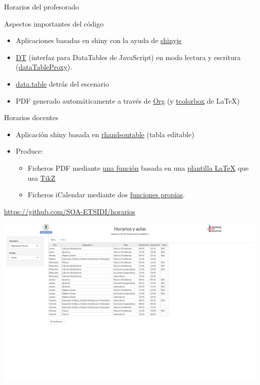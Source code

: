 \documentclass[spanish, xcolor={usenames,svgnames,dvipsnames}]{beamer}
\begin{document}
\begin{frame}[label={sec:org2fe8bf3}]{Horarios del profesorado}
\begin{block}{Aspectos importantes del código}
\begin{itemize}
\item Aplicaciones basadas en shiny con la ayuda de \href{https://daattali.com/shiny/shinyjs-demo/}{shinyjs}
\item \href{https://github.com/Rdatatable/data.table/wiki}{DT} (interfaz para DataTables de JavaScript) en modo lectura y escritura (\href{https://yihui.shinyapps.io/DT-proxy/}{dataTableProxy}).
\item \href{https://github.com/Rdatatable/data.table/wiki}{data.table} detrás del escenario
\item PDF generado automáticamente a través de \href{http://orgmode.org/}{Org} (y \href{https://www.ctan.org/pkg/tcolorbox}{tcolorbox} de \LaTeX{})
\end{itemize}
\end{block}
\end{frame}
\begin{frame}[label={sec:orgfb39c1d}]{Horarios docentes}
\begin{itemize}
\item Aplicación shiny basada en \href{http://jrowen.github.io/rhandsontable/}{rhandsontable} (tabla editable)
\item Produce:
\begin{itemize}
\item Ficheros PDF mediante \href{https://github.com/SOA-ETSIDI/horarios/blob/master/csv2tt.R}{una función} basada en una \href{https://github.com/SOA-ETSIDI/horarios/blob/master/timetable.tex}{plantilla \LaTeX{}} que usa \href{https://en.wikipedia.org/wiki/PGF/TikZ}{TikZ}
\item Ficheros iCalendar mediante dos \href{https://github.com/SOA-ETSIDI/misc/blob/master/funciones.R}{funciones propias}.
\end{itemize}
\end{itemize}
\begin{block}{}
\url{https://github.com/SOA-ETSIDI/horarios}
\end{block}
\end{frame}
\begin{frame}[label={sec:org995b659}]{}
\begin{center}
\includegraphics[width=.9\linewidth]{images/horarios.png}
\end{center}
\end{frame}
\end{document}
